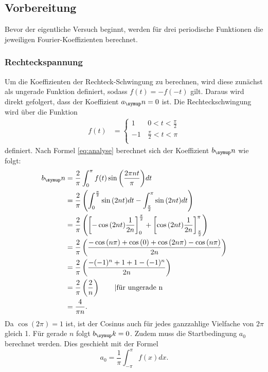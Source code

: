 \subsection{Vorbereitung}
Bevor der eigentliche Versuch beginnt, werden für drei periodische Funktionen
die jeweiligen Fourier-Koeffizienten berechnet.
\subsubsection{Rechteckspannung}
Um die Koeffizienten der Rechteck-Schwingung zu berechnen, wird diese zunächst
als ungerade Funktion definiert, sodass $f(t)=-f(-t)$ gilt. Daraus wird direkt
gefolgert, dass der Koeffizient $a_\su{n}=0$ ist.
Die Rechteckschwingung wird über die Funktion
  \begin{align}
  f(t)&=
  \begin{cases}
    1 & \, 0<t<\frac{\pi}{2} \\
    -1& \, \frac{\pi}{2}<t<\pi \\
  \end{cases}
\end{align}
definiert. Nach Formel \eqref{eq:analyse} berechnet sich der Koeffizient $b_\su{n}$
wie folgt:
\begin{align*}
  b_\su{n} &= \frac{2}{\pi}\int^\pi_0{f(t)\sin{\left(\frac{2\pi n t}{\pi}\right)} dt} \\
  &= \frac{2}{\pi}\left(\int_0^{\frac{\pi}{2}}{\sin{(2nt)} dt} -
  \int_{\frac{\pi}{2}}^\pi{\sin{(2nt)} dt}\right) \\
  &= \frac{2}{\pi}\left(\left[-\cos{(2nt)}\frac{1}{2n}\right]_0^{\frac{\pi}{2}} +
  \left[\cos{(2nt)}\frac{1}{2n}\right]_{\frac{\pi}{2}}^\pi\right) \\
  &= \frac{2}{\pi}\left(\frac{-\cos{(n\pi)}+\cos{(0)}+\cos{(2n\pi)}-\cos{(n\pi)}}{2n}\right) \\
  &= \frac{2}{\pi}\left(\frac{-(-1)^n+1+1-(-1)^n}{2n}\right) \\
  &= \frac{2}{\pi}\left(\frac{2}{n}\right) \qquad \text{|für ungerade n}\\
  &= \frac{4}{\pi n}.
\end{align*}
Da $\cos{(2\pi)}=1$ ist, ist der Cosinus auch für jedes ganzzahlige Vielfache von
$2\pi$ gleich 1. Für gerade $n$ folgt $b_\su{k}=0$.
Zudem muss die Startbedingung $a_0$ berechnet werden. Dies geschieht mit der
Formel
\begin{equation*}
  a_0 = \frac{1}{\pi}\int_{-\pi}^\pi{f(x) dx}.
\end{equation*}
